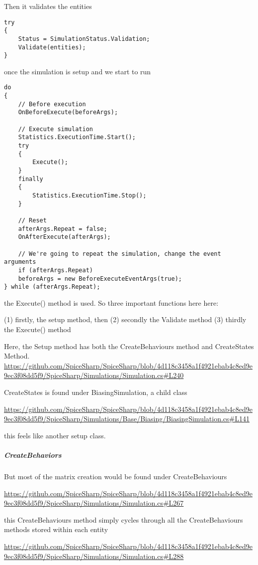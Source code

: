 \documentclass[12pt]{article}
\renewcommand{\_}{\kern-1.5pt\textunderscore\kern-1.5pt}
\begin{document}
Then it validates the entities

\begin{verbatim}
try
{
	Status = SimulationStatus.Validation;
	Validate(entities);
}
\end{verbatim}

once the simulation is setup and we start to run

\begin{verbatim}
do
{
	// Before execution
	OnBeforeExecute(beforeArgs);

	// Execute simulation
	Statistics.ExecutionTime.Start();
	try
	{
		Execute();
	}
	finally
	{
		Statistics.ExecutionTime.Stop();
	}

	// Reset
	afterArgs.Repeat = false;
	OnAfterExecute(afterArgs);

	// We're going to repeat the simulation, change the event arguments
	if (afterArgs.Repeat)
	beforeArgs = new BeforeExecuteEventArgs(true);
} while (afterArgs.Repeat);
\end{verbatim}

the Execute() method is used. So three important functions here here:

(1) firstly, the setup method, then (2) secondly the Validate method
(3) thirdly the Execute() method

Here, the Setup method has both the CreateBehaviours method and CreateStates Method.
\url{https://github.com/SpiceSharp/SpiceSharp/blob/4d118c3458a1f4921ebab4c8ed9e9ec3f08dd5f9/SpiceSharp/Simulations/Simulation.cs#L240}

CreateStates is found under BiasingSimulation, a child class

\url{https://github.com/SpiceSharp/SpiceSharp/blob/4d118c3458a1f4921ebab4c8ed9e9ec3f08dd5f9/SpiceSharp/Simulations/Base/Biasing/BiasingSimulation.cs#L141}

this feels like another setup class.

\subparagraph{CreateBehaviors}

But most of the matrix creation would be found under CreateBehaviours

\url{https://github.com/SpiceSharp/SpiceSharp/blob/4d118c3458a1f4921ebab4c8ed9e9ec3f08dd5f9/SpiceSharp/Simulations/Simulation.cs#L267}

this CreateBehaviours method simply cycles through all the CreateBehaviours methods stored
within each entity

\url{https://github.com/SpiceSharp/SpiceSharp/blob/4d118c3458a1f4921ebab4c8ed9e9ec3f08dd5f9/SpiceSharp/Simulations/Simulation.cs#L288}
\end{document}

